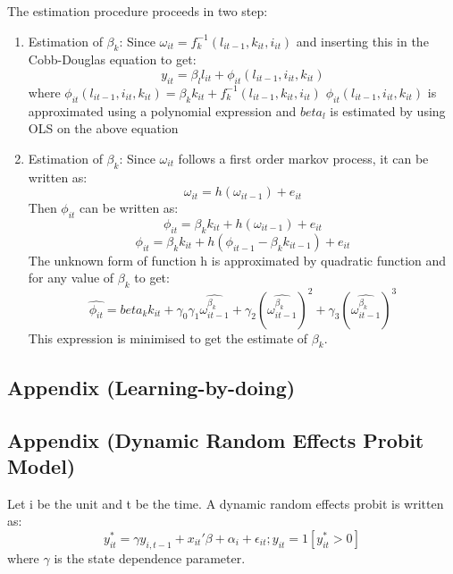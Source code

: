 \documentclass[12pt]{article}
\begin{document}
The estimation procedure proceeds in two step:
\begin{enumerate}
\item Estimation of $\beta_{k}$:
Since $\omega_{it}=f_{k}^{-1}(l_{it-1},k_{it},i_{it})$ and inserting
this in the Cobb-Douglas equation to get: 
$$ y_{it} = \beta_{l}l_{it} + \phi_{it}(l_{it-1},i_{it},k_{it})$$
where $\phi_{it}(l_{it-1},i_{it},k_{it}) =  \beta_{k}k_{it}+ f_{k}^{-1}(l_{it-1},k_{it},i_{it})$
$\phi_{it}(l_{it-1},i_{it},k_{it})$ is approximated using a polynomial
expression and $beta_{l}$ is estimated by using OLS on the above
equation
\item Estimation of $\beta_{k}$:
Since $\omega_{it}$ follows a first order markov process, it can be
written as: 
$$ \omega_{it} = h(\omega_{it-1}) + e_{it}$$
Then $\phi_{it}$ can be written as: 
$$ \phi_{it} = \beta_{k}k_{it} + h(\omega_{it-1}) + e_{it}$$
$$ \phi_{it} = \beta_{k}k_{it} + h(\phi_{it-1}- \beta_{k}k_{it-1}) + e_{it}$$
The unknown form of function h is approximated by quadratic function
and for any value of $\beta_k$ to get:
$$ \hat{\phi_{it}} = beta_{k}k_{it} +\gamma_{0}
\gamma_{1}\hat{\omega_{it-1}^{\beta_{k}}}+
\gamma_{2}(\hat{\omega_{it-1}^{\beta_{k}}})^{2}
+ \gamma_{3}(\hat{\omega_{it-1}^{\beta_{k}}})^{3} $$
 This expression is minimised to get the estimate of $\beta_{k}$. 
\end{enumerate}

\subsection{Appendix (Learning-by-doing)}


 


 


\subsection{Appendix (Dynamic Random Effects Probit  Model)}
Let i be the unit and t be the time. A dynamic random effects probit
is written as: 
$$ y_{it}^{*} = \gamma y_{i,t-1} + x_{it}'\beta + \alpha_{i} +
\epsilon_{it}; y_{it}=1[y_{it}^{*} > 0]$$
where $\gamma$ is the state dependence parameter.
\end{document}
